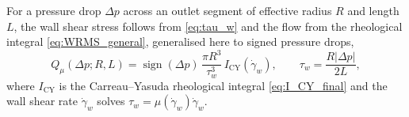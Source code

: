 \documentclass[lineno]{jfm}
\begin{document}
For a pressure drop $\Delta p$ across an outlet segment of effective radius $R$
and length~$L$, the wall shear stress follows from \eqref{eq:tau_w} and the flow
from the rheological integral \eqref{eq:WRMS_general}, generalised here to signed
pressure drops,
\begin{equation}
Q_{\mu}(\Delta p;R,L)
=
\operatorname{sign}(\Delta p)\,
\frac{\pi R^3}{\tau_w^3}\,I_{\mathrm{CY}}(\dot{\gamma}_w),
\qquad
\tau_w=\frac{R|\Delta p|}{2L},
\label{eq:coronary-wrms-flow-law}
\end{equation}
where $I_{\mathrm{CY}}$ is the Carreau--Yasuda rheological integral
\eqref{eq:I_CY_final} and the wall shear rate $\dot{\gamma}_w$ solves
$\tau_w=\mu(\dot{\gamma}_w)\dot{\gamma}_w$.
\end{document}
